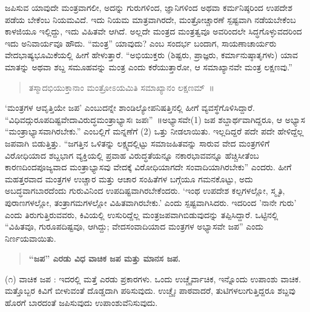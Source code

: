 {ಜಪಿಸುವ ಯಾವುದೇ ಮಂತ್ರವಾಗಲೀ, ಅದನ್ನು ಗುರುಗಳಿಂದ, ಜ್ಞಾನಿಗಳಿಂದ ಅಥವಾ ಕರ್ಮನಿಷ್ಠರಿಂದ ಉಪದೇಶ ಪಡೆಯ ಬೇಕೆಂಬ ನಿಯಮವಿದೆ. ಇದು ನಿಯಮ ಮಾತ್ರವಾಗಿರದೇ, ಮಂತ್ರೋಚ್ಚಾರಣೆ ಸ್ಪಷ್ಟವಾಗಿ ನಡೆಯಬೇಕೆಂಬ ಕಾಳಜಿಯೂ ಇಲ್ಲಿದ್ದು, ಇದು ವಿಹಿತವೇ ಆಗಿದೆ. ಅಲ್ಲದೇ ಮಂತ್ರದ ಮಂತ್ರತ್ವವೂ ಅವ\-ರಿಂದಲೇ ಸಿದ್ಧಗೊಳ್ಳುವದರಿಂದ ಇದು ಅನಿವಾರ್ಯವೂ ಹೌದು. “ಮಂತ್ರ” ಯಾವುದು? ಎಂಬ ಸಂದರ್ಭ ಬಂದಾಗ, ಸಾಯಣಾಚಾರ್ಯರು ವೇದಭಾಷ್ಯಭೂಮಿಕೆಯಲ್ಲಿ ಹೀಗೆ ಹೇಳುತ್ತಾರೆ. “ಅಭಿಯುಕ್ತರು (ಶಿಷ್ಟರು, ಪ್ರಾಜ್ಞರು, ಕರ್ಮಾನುಷ್ಠಾತೃಗಳು) ಯಾವ ಮಾತನ್ನು ಅಥವಾ ಶಬ್ದ ಸಮೂಹವನ್ನು ಮಂತ್ರ ಎಂದು ಕರೆಯುತ್ತಾರೋ, ಆ ಸಮಾಖ್ಯಾನವೇ ಮಂತ್ರ ಲಕ್ಷಣವು.” 
\begin{verse}
ತಸ್ಮಾದಭಿಯುಕ್ತಾನಾಂ ಮಂತ್ರೋಽಯಮಿತಿ ಸಮಾಖ್ಯಾನಂ ಲಕ್ಷಣಮ್~॥
\end{verse}
‘ಮಂತ್ರಗಳ ಆವೃತ್ತಿಯೇ ಜಪ’ ಎಂಬುದನ್ನೇ ಶಾಂಡಿಲ್ಯೋಪನಿಷತ್ತಿನಲ್ಲಿ ಹೀಗೆ ವ್ಯವಸ್ಥೆ\-ಗೊಳಿಸಿದ್ದಾರೆ. “ವಿಧಿವದ್ಗು\-ರೂಪದಿಷ್ಟ\enginline{-}ವೇದಾವಿರುದ್ಧ\enginline{-}ಮಂತ್ರಾಭ್ಯಾಸಃ ಜಪಃ”~॥\break ಅಭ್ಯಾಸವೇ(1) ಜಪ ಶಬ್ದಾರ್ಥವಾಗಿದ್ದರೂ, ಆ ಅಭ್ಯಾಸ “ಮಂತ್ರಾಭ್ಯಾಸವಾಗಿರಬೇಕು.” ಎಂಬಲ್ಲಿಗೆ ಮನ್ನಣೆಗೆ (2) ಒತ್ತು ನೀಡಲಾಯಿತು. ಇಲ್ಲದಿದ್ದರೆ ಪದೇ ಪದೇ ಹೇಳಿದ್ದೆಲ್ಲ ಜಪವಾಗಿ ಬಿಡುತ್ತಿತ್ತು. “ಜಗತ್ತಿನ ಒಳಿತನ್ನು ಲಕ್ಷ್ಯದಲ್ಲಿಟ್ಟು ಸಮಾಜಹಿತವನ್ನು ಸಾರುವ ವೇದ ಮಂತ್ರಗಳಿಗೆ ವಿರೋಧಿಯಾದ ಶಬ್ದಭಾಗ ವ್ಯಕ್ತಿಯಲ್ಲಿ ಪ್ರವಾಹ ವಿರುದ್ಧತೆ\-ಯನ್ನೂ ನಕಾರಭಾವವನ್ನೂ ಹೆಚ್ಚಿಸೀತೆಂಬ ಕಾರಣದಿಂದ\break ಪೂಜ್ಯವಾದ ಮಂತ್ರಾಭ್ಯಾಸವು ವೇದಕ್ಕೆ ವಿರೋಧಿಯಾಗದೇ ಸಂವಾದಿಯಾಗಿರಬೇಕು” ಎಂದರು. ಹೀಗೆ ಮಹತ್ತರವಾದ ಮಂತ್ರಗಳ ಉಚ್ಚಾರ ಮತ್ತು ಆಚಾರ ಸಂಹಿತೆಗಳ ಬಗ್ಗೆಯೂ ಗಮನಕೊಟ್ಟು, ಅದು ಅಬದ್ಧವಾಗಬಾರದೆಂದು ಗುರುವಿನಿಂದ ಉಪದಿಷ್ಟ\-ವಾಗಿರಬೇಕೆಂದರು. ‘ಇಂಥ ಉಪದೇಶ ಕಲ್ಪಗಳಲ್ಲೋ, ಸ್ಮೃತಿ, ಪುರಾಣಗಳಲ್ಲೋ, ತಂತ್ರಾಗಮಗಳಲ್ಲೋ ವಿಹಿತವಾಗಿರಬೇಕು.’ ಎಂದು ಸ್ಪಷ್ಟವಾಗಿಸಿದರು. ಇದರಿಂದ ’ನಾನೇ ಗುರು’ ಎಂದು ತಿರುಗುತ್ತಿರುವವರು, ಕಿವಿಯಲ್ಲಿ ಉಸುರಿದ್ದೆಲ್ಲ ಮಂತ್ರಜಪವಾಗಿಬಿಡುವುದನ್ನು ತಪ್ಪಿಸಿದ್ದಾರೆ. ಒಟ್ಟಿನಲ್ಲಿ “ವಿಹಿತವೂ, ಗುರೂಪದಿಷ್ಟವೂ, ಆಗಿದ್ದು; ವೇದಸಂವಾದಿಯಾದ ಮಂತ್ರಗಳ ಅಭ್ಯಾಸವೇ ಜಪ” ಎಂದು ನಿರ್ಣಯವಾಯಿತು.
\begin{verse}
\textbf{“ಜಪ” ಎರಡು ವಿಧ \enginline{-} ವಾಚಿಕ ಜಪ ಮತ್ತು ಮಾನಸ ಜಪ.}
\end{verse}
(೧) ವಾಚಿಕ ಜಪ : ಇದರಲ್ಲಿ ಮತ್ತೆ ಎರಡು ಪ್ರಕಾರಗಳು. ಒಂದು ಉಚ್ಚೈರ್ವಾಚಿಕ, ಇನ್ನೊಂದು ಉಪಾಂಶು ವಾಚಿಕ. ಮತ್ತೊಬ್ಬರ ಕಿವಿಗೆ ಬೀಳುವಂತೆ ದೊಡ್ಡದಾಗಿ ಪಠಿಸುವುದು. ಉಚ್ಚೈಃ ಪಾಠವಾದರೆ, ತುಟಿಗಳಲುಗುತ್ತಿದ್ದರೂ ಶಬ್ದವು ಹೊರಗೆ ಬಾರದಂತೆ ಜಪಿಸುವುದು ಉಪಾಂಶುವೆನಿಸುವುದು.

}
